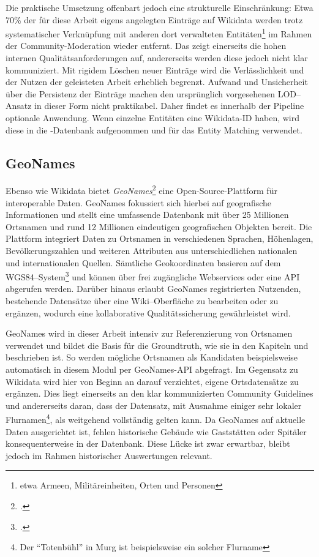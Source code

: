 \documentclass[12pt, a4paper, ngerman, bidi=default]{article}
\let\cite\footcite
\begin{document}
Die praktische Umsetzung offenbart jedoch eine strukturelle Einschränkung: Etwa 70\% der für diese Arbeit eigens angelegten Einträge auf Wikidata werden trotz systematischer Verknüpfung mit anderen dort verwalteten Entitäten\footnote{etwa Armeen, Militäreinheiten, Orten und Personen} im Rahmen der Community-Moderation wieder entfernt.
Das zeigt einerseits die hohen internen Qualitätsanforderungen auf, andererseits werden diese jedoch nicht klar kommuniziert. Mit rigidem Löschen neuer Einträge wird die Verlässlichkeit und der Nutzen der 
geleisteten Arbeit erheblich begrenzt. 
Aufwand und Unsicherheit über die Persistenz der Einträge machen den ursprünglich vorgesehenen LOD–Ansatz in dieser Form nicht praktikabel. Daher findet es innerhalb der Pipeline optionale Anwendung. Wenn einzelne Entitäten eine Wikidata-ID haben, wird diese in die -Datenbank aufgenommen und für das Entity Matching verwendet.

\subsection{GeoNames}\label{subsec:geonames}

Ebenso wie Wikidata bietet \textit{GeoNames}\cite[vgl.][]{noauthor_geonames_nodate} eine Open-Source-Plattform für interoperable Daten. GeoNames fokussiert sich hierbei auf geografische Informationen 
und stellt eine umfassende Datenbank mit über 25 Millionen Ortsnamen und rund 12 Millionen eindeutigen geografischen Objekten bereit.  
Die Plattform integriert Daten zu 
Ortsnamen in verschiedenen Sprachen, Höhenlagen, Bevölkerungszahlen und weiteren Attributen aus unterschiedlichen nationalen und internationalen Quellen.  
Sämtliche Geokoordinaten basieren auf dem WGS84–System\cite[\textit{WGS84: geodätische Grundlage des Global Positioning System (GPS)} ;vgl.][]{noauthor_wgs84_nodate}
und können über frei zugängliche Webservices oder eine API abgerufen werden.  
Darüber hinaus erlaubt GeoNames registrierten Nutzenden, bestehende Datensätze über eine Wiki–Oberfläche zu bearbeiten oder zu ergänzen, wodurch eine 
kollaborative Qualitätssicherung gewährleistet wird.

GeoNames wird in dieser Arbeit intensiv zur Referenzierung von Ortsnamen verwendet und bildet die Basis für die Groundtruth, wie sie in den Kapiteln  und 
 beschrieben ist. So werden mögliche Ortsnamen als Kandidaten beispielsweise automatisch in diesem Modul per GeoNames-API abgefragt.  Im Gegensatz zu Wikidata wird hier von Beginn an darauf verzichtet, eigene Ortsdatensätze zu ergänzen. Dies liegt einerseits an den klar kommunizierten Community Guidelines und andererseits daran, dass der Datensatz, mit Ausnahme einiger sehr lokaler Flurnamen\footnote{Der \enquote{Totenbühl} in Murg ist beispielsweise ein solcher Flurname}, als weitgehend vollständig gelten kann. Da GeoNames auf aktuelle Daten ausgerichtet ist, fehlen historische Gebäude wie Gaststätten oder Spitäler konsequenterweise in der Datenbank. Diese Lücke ist zwar erwartbar, bleibt jedoch im Rahmen historischer Auswertungen relevant.
\end{document}
